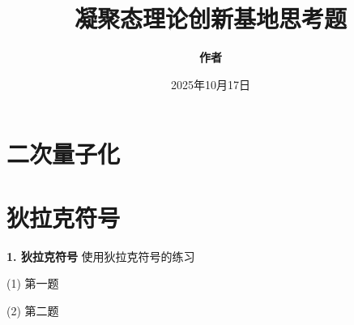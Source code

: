 \documentclass{article}
\title{\textbf{凝聚态理论创新基地思考题}}
\author{\textbf{作者}}
\affil{华中科技大学 \\ name@hust.edu.cn}
\date{2025年10月17日}
\begin{document}
\maketitle

\section*{二次量子化}
\section{狄拉克符号}
\noindent \textbf{1. 狄拉克符号} \quad 使用狄拉克符号的练习

(1) 第一题

(2) 第二题
\end{document}
